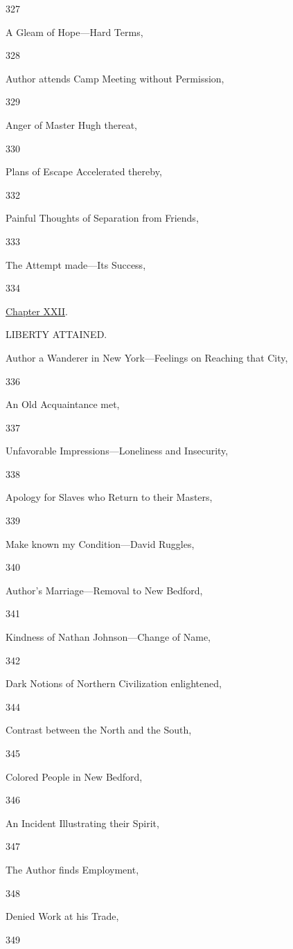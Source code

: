 327

A Gleam of Hope---Hard Terms,

328

Author attends Camp Meeting without Permission,

329

Anger of Master Hugh thereat,

330

Plans of Escape Accelerated thereby,

332

Painful Thoughts of Separation from Friends,

333

The Attempt made---Its Success,

334

\href{/wiki/My_Bondage_and_My_Freedom_(1855)/Chapter_XXII}{Chapter
XXII}.

LIBERTY ATTAINED.

Author a Wanderer in New York---Feelings on Reaching that City,

{336}

An Old Acquaintance met,

337

Unfavorable Impressions---Loneliness and Insecurity,

338

Apology for Slaves who Return to their Masters,

339

Make known my Condition---David Ruggles,

340

Author's Marriage---Removal to New Bedford,

341

Kindness of Nathan Johnson---Change of Name,

342

Dark Notions of Northern Civilization enlightened,

344

Contrast between the North and the South,

345

Colored People in New Bedford,

346

An Incident Illustrating their Spirit,

347

The Author finds Employment,

348

Denied Work at his Trade,

349

